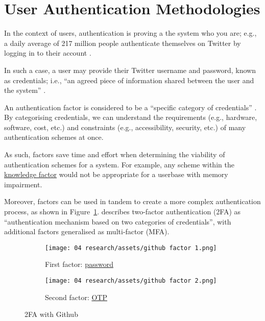 \section{User Authentication Methodologies}
\label{s:userAuth}

In the context of users, \gls{authentication} is proving a
the system who you are; e.g., a daily average of 217
million people authenticate themselves on Twitter by
logging in to their account \parencite[][Q4]{twitterUsage}.

In such a case, a user may provide their Twitter username
and password, known as credentials; i.e.,
\enquote{an agreed piece of information shared between the
  user and the system} \parencite{whatIsAuth}.

An authentication factor is considered to be a
\enquote{specific category of credentials}
\parencite{whatIsAuth}.
By categorising credentials, we can understand the
requirements (e.g., hardware, software, cost, etc.) and
constraints (e.g., accessibility, security, etc.) of many
authentication schemes at once.

As such, factors save time and effort when determining the
viability of authentication schemes for a system.
For example, any scheme within the
\hyperref[p:knowledge]{knowledge factor} would not be
appropriate for a userbase with memory impairment.

Moreover, factors can be used in tandem to create a more
complex authentication process, as shown in
Figure~\ref{fig:github2fa}.
\cite{whatIsAuth} describes
two-factor authentication (2FA) as
\enquote{authentication mechanism based on two categories
  of credentials}, with additional factors generalised as
multi-factor (MFA).

\begin{figure}[h]
  \centering
  \begin{subfigure}{\subfigwidth}
    \centering
    \texttt{[image: 04
      research/assets/github factor 1.png]}
    \caption{First factor:
      \hyperref[ss:passwords]{password}}
  \end{subfigure}
  \begin{subfigure}{\subfigwidth}
    \centering
    \texttt{[image: 04
      research/assets/github factor 2.png]}
    \caption{Second factor: \hyperref[ss:otp]{OTP}}

  \end{subfigure}

  \caption{2FA with Github}
  \label{fig:github2fa}
\end{figure}

